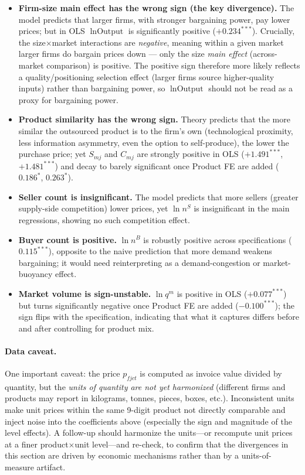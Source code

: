 \documentclass[12pt]{article}
\begin{document}
\begin{itemize}[leftmargin=1.5em,nosep]
  \item \textbf{Firm-size main effect has the wrong sign (the key divergence).}
    The model predicts that larger firms, with stronger bargaining power, pay
    lower prices; but in OLS \(\ln\text{Output}\) is significantly positive
    (\(+0.234^{***}\)). Crucially, the size\(\times\)market interactions are
    \emph{negative}, meaning within a given market larger firms do bargain prices
    down --- only the size \emph{main effect} (across-market comparison) is
    positive. The positive sign therefore more likely reflects a
    quality/positioning selection effect (larger firms source higher-quality
    inputs) rather than bargaining power, so
    \(\ln\text{Output}\) should not be read as a proxy for bargaining power.
  \item \textbf{Product similarity has the wrong sign.} Theory predicts that the
    more similar the outsourced product is to the firm's own (technological
    proximity, less information asymmetry, even the option to self-produce), the
    lower the purchase price; yet \(S_{mj}\) and \(C_{mj}\) are strongly positive
    in OLS (\(+1.491^{***}\), \(+1.481^{***}\)) and decay to barely significant
    once Product FE are added (\(0.186^{*}\), \(0.263^{*}\)). 
  \item \textbf{Seller count is insignificant.} The model predicts that more
    sellers (greater supply-side competition) lower prices, yet \(\ln n^S\) is
    insignificant in the main regressions, showing no such competition effect.
  \item \textbf{Buyer count is positive.} \(\ln n^B\) is robustly positive across
    specifications (\(0.115^{***}\)), opposite to the naive prediction that more
    demand weakens bargaining; it would need reinterpreting as a demand-congestion
    or market-buoyancy effect.
  \item \textbf{Market volume is sign-unstable.} \(\ln q^m\) is positive in OLS
    (\(+0.077^{***}\)) but turns significantly negative once Product FE are added
    (\(-0.100^{***}\)); the sign flips with the specification, indicating that
    what it captures differs before and after controlling for product mix.
\end{itemize}

\paragraph{Data caveat.}
One important caveat: the price \(p_{fjct}\) is computed as invoice value divided
by quantity, but the \emph{units of quantity are not yet harmonized} (different
firms and products may report in kilograms, tonnes, pieces, boxes, etc.).
Inconsistent units make unit prices within the same 9-digit product not directly
comparable and inject noise into the coefficients above (especially the sign and
magnitude of the level effects). A follow-up should harmonize the units---or
recompute unit prices at a finer product\(\times\)unit level---and re-check, to
confirm that the divergences in this section are driven by economic mechanisms
rather than by a units-of-measure artifact.
\end{document}
